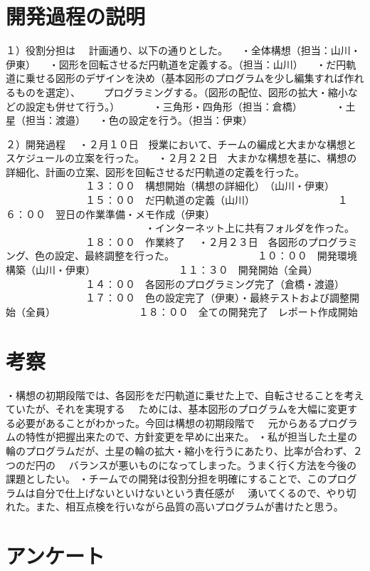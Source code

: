 \documentclass[12pt,a4j]{jarticle}
\begin{document}
\section{開発過程の説明}

１）役割分担は
　計画通り、以下の通りとした。
　・全体構想（担当：山川・伊東）
　・図形を回転させるだ円軌道を定義する。（担当：山川）
　・だ円軌道に乗せる図形のデザインを決め（基本図形のプログラムを少し編集すれば作れるものを選定）、
　　プログラミングする。（図形の配位、図形の拡大・縮小などの設定も併せて行う。）
　　　・三角形・四角形（担当：倉橋）
　　　・土星（担当：渡邉）
　・色の設定を行う。（担当：伊東）

２）開発過程
　・２月１０日　授業において、チームの編成と大まかな構想とスケジュールの立案を行った。
　・２月２２日　大まかな構想を基に、構想の詳細化、計画の立案、図形を回転させるだ円軌道の定義を行った。
　　　　　　　　１３：００　構想開始（構想の詳細化）　（山川・伊東）
　　　　　　　　１５：００　だ円軌道の定義（山川）
　　　　　　　　１６：００　翌日の作業準備・メモ作成（伊東）
　　　　　　　　　　　　　　・インターネット上に共有フォルダを作った。
　　　　　　　　１８：００　作業終了
　・２月２３日　各図形のプログラミング、色の設定、最終調整を行った。
　　　　　　　　１０：００　開発環境構築（山川・伊東）
　　　　　　　　１１：３０　開発開始（全員）
　　　　　　　　１４：００　各図形のプログラミング完了（倉橋・渡邉）
　　　　　　　　１７：００　色の設定完了（伊東）・最終テストおよび調整開始（全員）
　　　　　　　　１８：００　全ての開発完了　レポート作成開始

\section{考察}

・構想の初期段階では、各図形をだ円軌道に乗せた上で、自転させることを考えていたが、それを実現する
　ためには、基本図形のプログラムを大幅に変更する必要があることがわかった。今回は構想の初期段階で
　元からあるプログラムの特性が把握出来たので、方針変更を早めに出来た。
・私が担当した土星の輪のプログラムだが、土星の輪の拡大・縮小を行うにあたり、比率が合わず、２つのだ円の
　バランスが悪いものになってしまった。うまく行く方法を今後の課題としたい。
・チームでの開発は役割分担を明確にすることで、このプログラムは自分で仕上げないといけないという責任感が
　湧いてくるので、やり切れた。また、相互点検を行いながら品質の高いプログラムが書けたと思う。

\section{アンケート}
\end{document}
